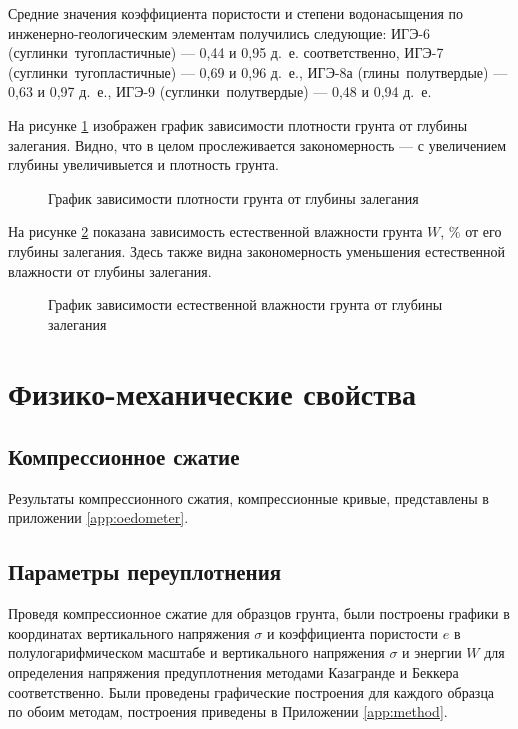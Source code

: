 Средние значения коэффициента пористости и 
степени водонасыщения по инженерно-геологическим 
элементам получились следующие:
ИГЭ-6 (суглинки тугопластичные) --- 0,44 и 0,95 д.~е. соответственно, 
ИГЭ-7 (суглинки тугопластичные) --- 0,69 и 0,96 д.~е., 
ИГЭ-8а (глины полутвердые) --- 0,63 и 0,97 д.~е., 
ИГЭ-9 (суглинки полутвердые) --- 0,48 и 0,94 д.~е.

На рисунке \ref{fig:plgl} изображен график зависимости плотности 
грунта от глубины залегания. Видно, что в целом прослеживается 
закономерность --- с увеличением глубины увеличивыется и 
плотность грунта.

\begin{figure}[ht]
  \caption{График зависимости плотности грунта от глубины залегания}\label{fig:plgl}
\end{figure}

На рисунке \ref{fig:vlgl} показана зависимость 
естественной влажности грунта $W$, \% от его глубины залегания.
Здесь также видна закономерность уменьшения естественной 
влажности от глубины залегания.

\begin{figure}[ht]
  \caption{График зависимости естественной влажности грунта от глубины залегания}\label{fig:vlgl}
\end{figure}

\section{Физико-механические свойства}

\subsection{Компрессионное сжатие}

Результаты компрессионного сжатия, 
компрессионные кривые, представлены в 
приложении \ref{app:oedometer}.

\subsection{Параметры переуплотнения}

Проведя компрессионное сжатие для образцов грунта, были построены 
графики в координатах вертикального напряжения $\sigma$ и коэффициента пористости $e$ 
в полулогарифмическом масштабе и вертикального напряжения $\sigma$ 
и энергии $W$ для определения напряжения предуплотнения 
методами Казагранде и Беккера соответственно. Были проведены 
графические построения для каждого образца по обоим 
методам, построения приведены в Приложении \ref{app:method}.

